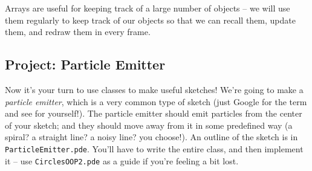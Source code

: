 Arrays are useful for keeping track of a large number of objects -- we will use them regularly to keep track of our objects so that we can recall them, update them, and redraw them in every frame.

\subsection{Project: Particle Emitter}
Now it's your turn to use classes to make useful sketches!  We're going to make a \emph{particle emitter}, which is a very common type of sketch (just Google for the term and see for yourself!).  The particle emitter should emit particles from the center of your sketch; and they should move away from it in some predefined way (a spiral? a straight line? a noisy line?  you choose!).  An outline of the sketch is in \texttt{ParticleEmitter.pde}.  You'll have to write the entire class, and then implement it -- use \texttt{CirclesOOP2.pde} as a guide if you're feeling a bit lost.

